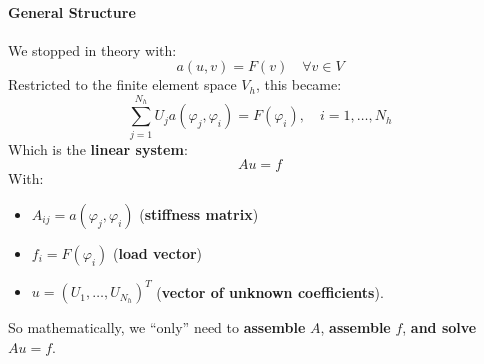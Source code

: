 \paragraph{General Structure}

We stopped in theory with:
\begin{equation*}
    a(u,v) = F(v) \quad \forall v \in V
\end{equation*}
Restricted to the finite element space $V_h$, this became:
\begin{equation*}
    \sum_{j=1}^{N_h} U_j a(\varphi_j,\varphi_i) = F(\varphi_i), \quad i=1,\dots,N_h
\end{equation*}
Which is the \textbf{linear system}:
\begin{equation*}
    A u = f
\end{equation*}
With:
\begin{itemize}
    \item $A_{ij} = a(\varphi_j,\varphi_i)$ (\textbf{stiffness matrix})
    \item $f_i = F(\varphi_i)$ (\textbf{load vector})
    \item $u = (U_1, \ldots, U_{N_h})^T$ (\textbf{vector of unknown coefficients}).
\end{itemize}
So mathematically, we ``only'' need to \textbf{assemble} $A$, \textbf{assemble} $f$, \textbf{and solve} $Au=f$.

